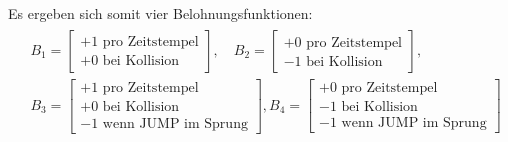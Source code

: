 \par
Es ergeben sich somit vier Belohnungsfunktionen:
\begin{multline}
    \begin{aligned}
& B_{1} =  \begin{bmatrix} +1 \text{ pro Zeitstempel}\\  +0 \text{ bei Kollision} \end{bmatrix}, \quad
B_{2} =  \begin{bmatrix} +0 \text{ pro Zeitstempel} \\ -1 \text{ bei Kollision}   \end{bmatrix}, \\
& B_{3} =  \begin{bmatrix}  +1 \text{ pro Zeitstempel}\\  +0 \text{ bei Kollision} \\ -1 \text{ wenn JUMP im Sprung}   \end{bmatrix},
B_{4} =  \begin{bmatrix} +0 \text{ pro Zeitstempel} \\ -1 \text{ bei Kollision} \\  -1 \text{ wenn JUMP im Sprung}   \end{bmatrix}
\end{aligned}
\end{multline}